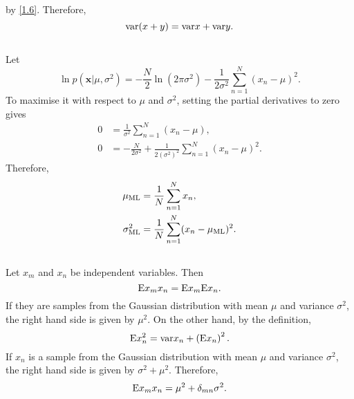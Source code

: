 %
by \ref{1.6}. Therefore,
%
\begin{equation}
{\rm var} (x + y) = {\rm var} x + {\rm var} y.
\end{equation}
%


\subsection{}
\label{1.11}
Let
%
\begin{equation}
\ln p \left( \mathbf{x} | \mu, \sigma ^ 2 \right) = - \frac{N}{2} \ln \left( 2 \pi \sigma ^ 2 \right) - \frac{1}{2 \sigma ^ 2} \sum_{n = 1}^{N} (x_n - \mu) ^ 2.
\end{equation}
%
To maximise it with respect to $\mu$ and $\sigma ^ 2$, setting the partial derivatives to zero gives
%
\begin{equation}
\begin{aligned}
0 &= \frac{1}{\sigma ^ 2} \sum_{n = 1}^{N} (x_n - \mu), \\
0 &= - \frac{N}{2 \sigma ^ 2} + \frac{1}{2 \left( \sigma ^ 2 \right) ^ 2} \sum_{n = 1}^{N} (x_n - \mu) ^ 2.
\end{aligned}
\end{equation}
%
Therefore,
%
\begin{equation}
\begin{aligned}
\mu_{\rm ML} &= \frac{1}{N} \sum_{n = 1}^{N} x_n, \\
\sigma_{\rm ML} ^ 2 &= \frac{1}{N} \sum_{n = 1}^{N} (x_n - \mu_{\rm ML}) ^ 2.
\end{aligned}
\end{equation}
%


\subsection{}
\label{1.12}
Let $x_m$ and $x_n$ be independent variables. 
Then
%
\begin{equation}
{\rm E} x_m x_n = {\rm E} x_m {\rm E} x_n.
\end{equation}
%
If they are samples from the Gaussian distribution with mean $\mu$ and variance $\sigma ^ 2$, the right hand side is given by $\mu ^ 2$.
On the other hand, by the definition, 
%
\begin{equation}
{\rm E} x_n ^ 2 =  {\rm var} x_n + \left( {\rm E} x_n \right) ^ 2.
\end{equation}
%
If $x_n$ is a sample from the Gaussian distribution with mean $\mu$ and variance $\sigma ^ 2$, the right hand side is given by $\sigma ^ 2 + \mu ^ 2$.
Therefore,
%
\begin{equation}
{\rm E} x_m x_n = \mu ^ 2 + \delta_{mn} \sigma ^ 2.
\end{equation}
%

